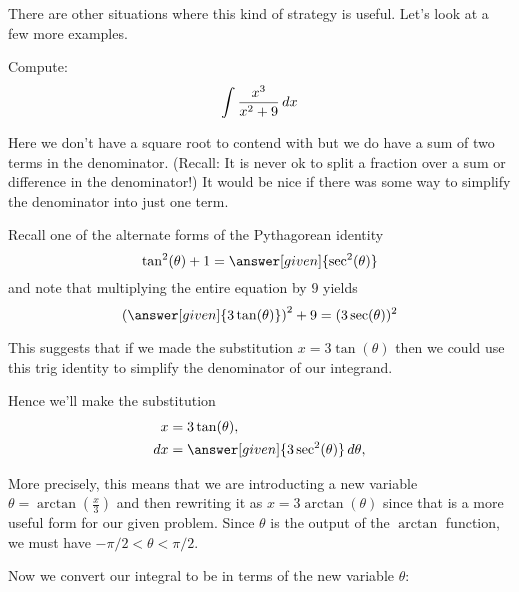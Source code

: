 \documentclass{ximera}
\begin{document}
There are other situations where this kind of strategy is useful. Let's look at a few more examples.

\begin{example}
  Compute:
  \[
  \int \frac{x^3}{x^2+9} \mathop{}\!d x
  \]
  \begin{explanation}
Here we don't have a square root to contend with but we do have a sum of two 
terms in the denominator. (Recall: It is never ok to split a fraction over a sum or difference in the denominator!)   It would be nice if there was some way to simplify the denominator into just one term. 

   Recall one of the alternate forms of the Pythagorean identity
    \[
    \tan^2(\theta) + 1 = \answer[given]{\sec^2(\theta)}
    \]
    and note that multiplying the entire equation by $9$ yields
    \[
    \left(\answer[given]{3\tan(\theta)}\right)^2 + 9 = (3\sec(\theta))^2
    \]

This suggests that if we made the substitution $x=3\tan(\theta)$ then we could
use this trig identity to simplify the denominator of our integrand. 

    Hence we'll make the substitution
    \begin{align*}
      x &= 3\tan(\theta),\\
      \d x &= \answer[given]{3\sec^2(\theta)} \d \theta,
    \end{align*}

\begin{remark}
More precisely, this means that we are introducting a new variable $\theta=\arctan\left(\frac{x}{3}\right)$ 
and then rewriting it as $x=3\arctan(\theta)$ since that is a more useful form 
for our given problem. Since $\theta$ is the output of the $\arctan$ function, we must have
$-\pi/2 < \theta < \pi/2$. 
\end{remark}

Now we convert our integral to be in terms of the new variable $\theta$:


\end{explanation}
\end{example}
\end{document}
